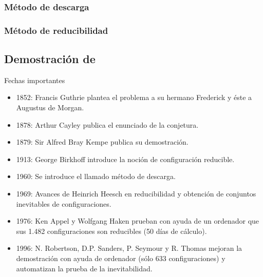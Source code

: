 \documentclass[spanish,utf8]{beamer}
\theoremstyle{definition}
\begin{document}
\subsubsection{Método de descarga}
\subsubsection{Método de reducibilidad}

\subsection{Demostración de \citeauthor{robertson}}


\begin{frame}{\insertsection}\transblindsvertical
Fechas importantes
\begin{itemize}
    \item 1852: Francis Guthrie plantea el problema a su hermano Frederick y éste a Augustus de Morgan.
    
    \item  1878: Arthur Cayley publica el enunciado de la conjetura.
    
    \item  1879: Sir Alfred Bray Kempe publica su demostración.
    
    \item  1913: George Birkhoff introduce la noción de configuración reducible.
    
    \item  1960: Se introduce el llamado método de descarga.
    
    \item  1969: Avances de Heinrich Heesch en reducibilidad y obtención de conjuntos inevitables de configuraciones.
    
    \item 1976: Ken Appel y Wolfgang Haken prueban con ayuda de un ordenador que sus 1.482 configuraciones son reducibles (50 días de cálculo).
    
    \item  1996: N. Robertson, D.P. Sanders, P. Seymour y R. Thomas mejoran la demostración con ayuda de ordenador (sólo 633 configuraciones) y automatizan la prueba de la inevitabilidad.
\end{itemize}   
\end{frame}
\end{document}
